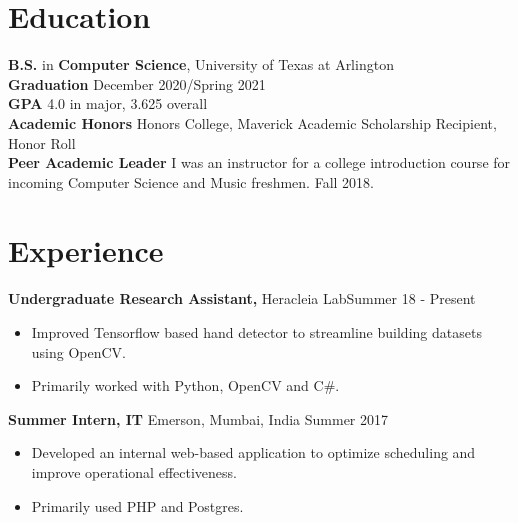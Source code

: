 \documentclass[margin]{res}
\begin{document}
 
 
 
\address{{\bf Present Address} \\ 402 Kerby Street \\ Arlington, TX 76013  \\
        (682) 551-2698 }
\address{{\bf Email} \\ adarsh9pai@gmail.com\\{\bf GitHub} github.com/adarsh9pai \\
        {Website} www.adarshpai.com }

 
\begin{resume} 

\section{Education} 
{\bf B.S.} in {\bf Computer Science}, University of Texas at Arlington\\
{\bf Graduation} December 2020/Spring 2021\\
{\bf GPA} 4.0 in major, 3.625 overall\\
{\bf Academic Honors} Honors College, Maverick Academic Scholarship Recipient, Honor Roll\\
{\bf Peer Academic Leader} I was an instructor for a college introduction course for incoming Computer Science and Music freshmen. Fall 2018.
 

\section{Experience}
 {\bf Undergraduate Research Assistant,} Heracleia Lab\hfill Summer 18 - Present
 \begin{itemize} \itemsep -2pt  %
 \item Improved Tensorflow based hand detector to streamline building datasets using OpenCV.
 \item Primarily worked with Python, OpenCV and C\#.
 \end{itemize}

 
 
{\bf Summer Intern, IT} Emerson, Mumbai, India \hfill  Summer 2017
\begin{itemize} \itemsep -2pt %
\item Developed an internal web-based application to optimize scheduling and improve operational effectiveness.
\item Primarily used PHP and Postgres.
\end{itemize}



\end{resume}
\end{document}
